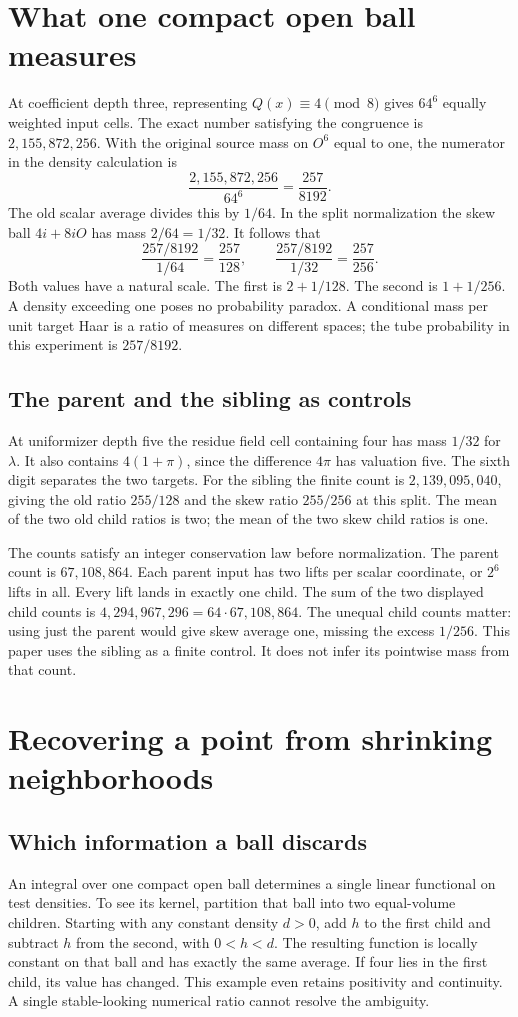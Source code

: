 \documentclass[12pt,letterpaper]{article}
\begin{document}
\section{What one compact open ball measures}
At coefficient depth three, representing $Q(x)\equiv4\pmod8$ gives $64^6$ equally weighted input cells. The exact number satisfying the congruence is $2{,}155{,}872{,}256$. With the original source mass on $O^6$ equal to one, the numerator in the density calculation is
\[
     \frac{2{,}155{,}872{,}256}{64^6}
     =\frac{257}{8192}.
\]
The old scalar average divides this by $1/64$. In the split normalization the skew ball $4i+8iO$ has mass $2/64=1/32$. It follows that
\[
\frac{257/8192}{1/64}=\frac{257}{128},
\qquad
\frac{257/8192}{1/32}=\frac{257}{256}.
\]
Both values have a natural scale. The first is $2+1/128$. The second is $1+1/256$. A density exceeding one poses no probability paradox. A conditional mass per unit target Haar is a ratio of measures on different spaces; the tube probability in this experiment is $257/8192$.

\subsection{The parent and the sibling as controls}
At uniformizer depth five the residue field cell containing four has mass $1/32$ for $\lambda$. It also contains $4(1+\pi)$, since the difference $4\pi$ has valuation five. The sixth digit separates the two targets. For the sibling the finite count is $2{,}139{,}095{,}040$, giving the old ratio $255/128$ and the skew ratio $255/256$ at this split. The mean of the two old child ratios is two; the mean of the two skew child ratios is one.

The counts satisfy an integer conservation law before normalization. The parent count is $67{,}108{,}864$. Each parent input has two lifts per scalar coordinate, or $2^6$ lifts in all. Every lift lands in exactly one child. The sum of the two displayed child counts is $4{,}294{,}967{,}296=64\cdot67{,}108{,}864$. The unequal child counts matter: using just the parent would give skew average one, missing the excess $1/256$. This paper uses the sibling as a finite control. It does not infer its pointwise mass from that count.

\section{Recovering a point from shrinking neighborhoods}
\subsection{Which information a ball discards}
An integral over one compact open ball determines a single linear functional on test densities. To see its kernel, partition that ball into two equal-volume children. Starting with any constant density $d>0$, add $h$ to the first child and subtract $h$ from the second, with $0<h<d$. The resulting function is locally constant on that ball and has exactly the same average. If four lies in the first child, its value has changed. This example even retains positivity and continuity. A single stable-looking numerical ratio cannot resolve the ambiguity.
\end{document}
